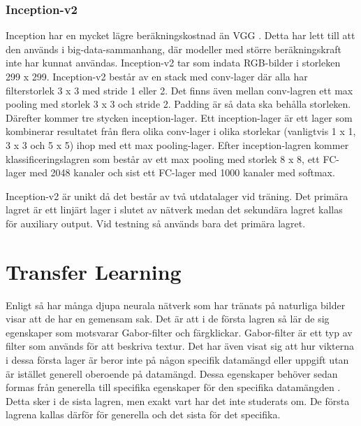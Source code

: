 \documentclass[]{kththesis}
\begin{document}
\subsubsection{Inception-v2}
Inception har en mycket lägre beräkningskostnad än VGG \parencite{szegedy2016rethinking}. Detta har lett till att den används i big-data-sammanhang, där modeller med större beräkningskraft inte har kunnat användas. Inception-v2 tar som indata RGB-bilder i storleken 299 x 299. Inception-v2 består av en stack med conv-lager där alla har filterstorlek 3 x 3 med stride 1 eller 2. Det finns även mellan conv-lagren ett max pooling med storlek 3 x 3 och stride 2. Padding är så data ska behålla storleken. Därefter kommer tre stycken inception-lager. Ett inception-lager är ett lager som kombinerar resultatet från flera olika conv-lager i olika storlekar (vanligtvis 1 x 1, 3 x 3 och 5 x 5) ihop med ett max pooling-lager. Efter inception-lagren kommer klassificeringslagren som består av ett max pooling med storlek 8 x 8, ett FC-lager med 2048 kanaler och sist ett FC-lager med 1000 kanaler med softmax.

Inception-v2 är unikt då det består av två utdatalager vid träning. \parencite{szegedy2016rethinking} Det primära lagret är ett linjärt lager i slutet av nätverk medan det sekundära lagret kallas för auxiliary output. Vid testning så används bara det primära lagret.

\section{Transfer Learning}
Enligt \cite{yosinski2014transferable} så har många djupa neurala nätverk som har tränats på naturliga bilder visar att de har en gemensam sak. Det är att i de första lagren så lär de sig egenskaper som motsvarar Gabor-filter och färgklickar. Gabor-filter är ett typ av filter som används för att beskriva textur. Det har även visat sig att hur vikterna i dessa första lager är beror inte på någon specifik datamängd eller uppgift utan är istället generell oberoende på datamängd. Dessa egenskaper behöver sedan formas från generella till specifika egenskaper för den specifika datamängden \parencite{yosinski2014transferable}. Detta sker i de sista lagren, men exakt vart har det inte studerats om. De första lagrena kallas därför för generella och det sista för det specifika.
\end{document}
